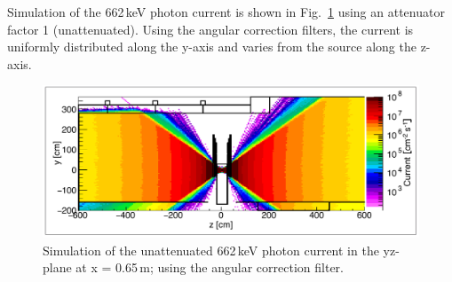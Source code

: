Simulation of the 662\,keV photon current is shown in Fig.~\ref{fig:gif_simul} using an attenuator factor 1 (unattenuated). Using the angular correction filters, the current is uniformly distributed along the y-axis and varies from the source along the z-axis. 
\begin{figure}[h]
\centering
 \includegraphics[scale=0.55,trim=0 0 0 0,clip]{fig/wincc/Current_gifpp_DS_US_flatSurfaceCurrent_600_662_x_60_70.pdf}
 \caption{Simulation of the unattenuated 662\,keV photon current in the yz-plane at x = 0.65\,m; using the angular correction filter.}
\label{fig:gif_simul}
\end{figure}

